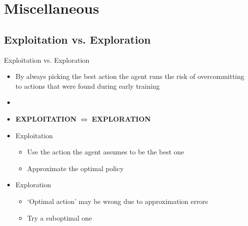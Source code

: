 \section{Miscellaneous}

\subsection{Exploitation vs. Exploration}

\begin{frame}{Exploitation vs. Exploration}{}
	\begin{itemize}
		\item By always picking the best action the agent runs the risk of overcommitting to actions that were found
			during early training
		\item {}
		\item \textbf{EXPLOITATION} $\bm{\Leftrightarrow}$ \textbf{EXPLORATION}
		\item Exploitation
		\begin{itemize}
			\item Use the action the agent assumes to be the best one
			\item Approximate the optimal policy
		\end{itemize}
		\item Exploration
		\begin{itemize}
			\item `Optimal action' may be wrong due to approximation errors
			\item Try a suboptimal one
		\end{itemize}
	\end{itemize}
\end{frame}



